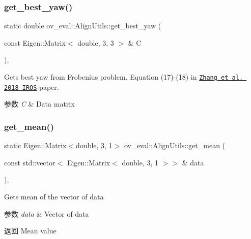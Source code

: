 \subsubsection{\texorpdfstring{get\+\_\+best\+\_\+yaw()}{get\_best\_yaw()}}
{\footnotesize\ttfamily static double ov\+\_\+eval\+::\+Align\+Utils\+::get\+\_\+best\+\_\+yaw (\begin{DoxyParamCaption}\item[{const Eigen\+::\+Matrix$<$ double, 3, 3 $>$ \&}]{C }\end{DoxyParamCaption})\hspace{0.3cm}{\ttfamily [inline]}, {\ttfamily [static]}}



Gets best yaw from Frobenius problem. Equation (17)-\/(18) in \href{http://rpg.ifi.uzh.ch/docs/IROS18_Zhang.pdf}{\tt Zhang et al. 2018 I\+R\+OS} paper. 


\begin{DoxyParams}{参数}
{\em C} & Data matrix \\
\hline
\end{DoxyParams}
\mbox{\label{classov__eval_1_1AlignUtils_a773b70968bab53fcaf45db308a70fe82}} 
\subsubsection{\texorpdfstring{get\+\_\+mean()}{get\_mean()}}
{\footnotesize\ttfamily static Eigen\+::\+Matrix$<$double, 3, 1$>$ ov\+\_\+eval\+::\+Align\+Utils\+::get\+\_\+mean (\begin{DoxyParamCaption}\item[{const std\+::vector$<$ Eigen\+::\+Matrix$<$ double, 3, 1 $>$$>$ \&}]{data }\end{DoxyParamCaption})\hspace{0.3cm}{\ttfamily [inline]}, {\ttfamily [static]}}



Gets mean of the vector of data 


\begin{DoxyParams}{参数}
{\em data} & Vector of data \\
\hline
\end{DoxyParams}
\begin{DoxyReturn}{返回}
Mean value 
\end{DoxyReturn}
\mbox{\label{classov__eval_1_1AlignUtils_a222cc11925f47bb8055aaf73d4336490}} 
